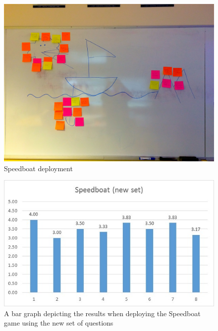 \begin{figure}[!htbp]
\caption{Speedboat deployment}
\label{fig:speedboatLive}
\centering
\includegraphics[width=1\textwidth]{live/speedboatLive}
\end{figure}

\begin{figure}[!htbp]
\caption{A bar graph depicting the results when deploying the Speedboat game using the new set of questions}
\label{fig:speedboatResultsNew}
\centering
\includegraphics[width=1\textwidth]{charts/speedboatNewSet}
\end{figure}

